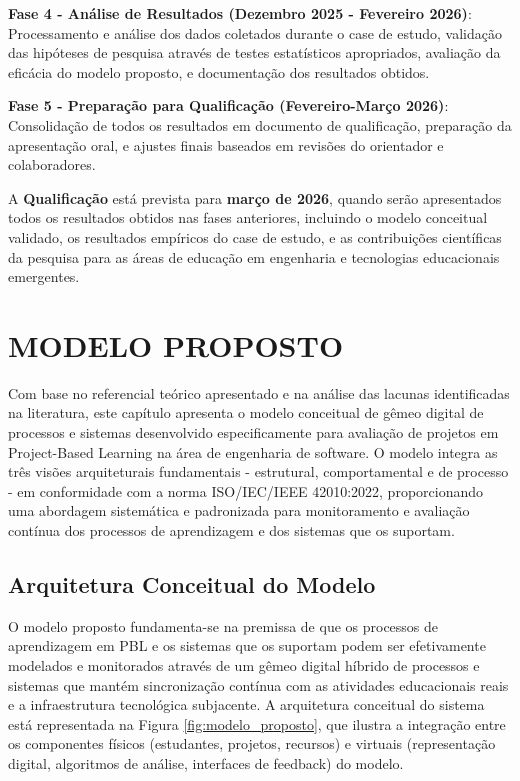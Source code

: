 \documentclass[12pt, a4paper, oneside]{abntex2}
\begin{document}
\textbf{Fase 4 - Análise de Resultados (Dezembro 2025 - Fevereiro 2026)}: Processamento e análise dos dados coletados durante o case de estudo, validação das hipóteses de pesquisa através de testes estatísticos apropriados, avaliação da eficácia do modelo proposto, e documentação dos resultados obtidos.

\textbf{Fase 5 - Preparação para Qualificação (Fevereiro-Março 2026)}: Consolidação de todos os resultados em documento de qualificação, preparação da apresentação oral, e ajustes finais baseados em revisões do orientador e colaboradores.

A \textbf{Qualificação} está prevista para \textbf{março de 2026}, quando serão apresentados todos os resultados obtidos nas fases anteriores, incluindo o modelo conceitual validado, os resultados empíricos do case de estudo, e as contribuições científicas da pesquisa para as áreas de educação em engenharia e tecnologias educacionais emergentes.

\section{MODELO PROPOSTO}

Com base no referencial teórico apresentado e na análise das lacunas identificadas na literatura, este capítulo apresenta o modelo conceitual de gêmeo digital de processos e sistemas desenvolvido especificamente para avaliação de projetos em Project-Based Learning na área de engenharia de software. O modelo integra as três visões arquiteturais fundamentais - estrutural, comportamental e de processo - em conformidade com a norma ISO/IEC/IEEE 42010:2022, proporcionando uma abordagem sistemática e padronizada para monitoramento e avaliação contínua dos processos de aprendizagem e dos sistemas que os suportam.

\subsection{Arquitetura Conceitual do Modelo}

O modelo proposto fundamenta-se na premissa de que os processos de aprendizagem em PBL e os sistemas que os suportam podem ser efetivamente modelados e monitorados através de um gêmeo digital híbrido de processos e sistemas que mantém sincronização contínua com as atividades educacionais reais e a infraestrutura tecnológica subjacente. A arquitetura conceitual do sistema está representada na Figura \ref{fig:modelo_proposto}, que ilustra a integração entre os componentes físicos (estudantes, projetos, recursos) e virtuais (representação digital, algoritmos de análise, interfaces de feedback) do modelo.
\end{document}
